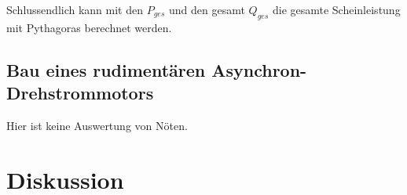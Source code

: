 \documentclass[12pt,english,ngerman]{scrartcl}
\begin{document}
Schlussendlich kann mit den $P_{ges}$ und den gesamt $Q_{ges}$ die gesamte
Scheinleistung mit Pythagoras berechnet werden.


\subsection{Bau eines rudimentären Asynchron-Drehstrommotors}

Hier ist keine Auswertung von Nöten.

\section{Diskussion}\label{sec:diskussion}
\end{document}
